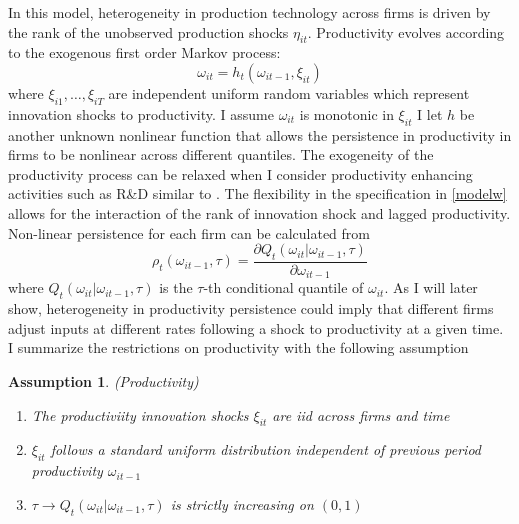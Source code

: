 \documentclass{article}
\newtheorem{assump}{Assumption}[section]
\begin{document}
In this model, heterogeneity in production technology across firms is driven by the rank of the unobserved production shocks $\eta_{it}$. Productivity evolves according to the exogenous first order Markov process:
\begin{equation}\label{modelw}
\omega_{it}=h_{t}(\omega_{it-1}, \xi_{it})
\end{equation}
where $\xi_{i1},\dots, \xi_{iT}$ are independent uniform random variables which represent innovation shocks to productivity. I assume $\omega_{it}$ is monotonic in $\xi_{it}$ I let $h$ be another unknown nonlinear function that allows the persistence in productivity in firms to be nonlinear across different quantiles. The exogeneity of the productivity process can be relaxed when I consider productivity enhancing activities such as R\&D similar to \cite{Doraszelski2013}. The flexibility in the specification in \eqref{modelw} allows for the interaction of the rank of innovation shock and lagged productivity. Non-linear persistence for each firm can be calculated from
\begin{equation}
\rho_{t}(\omega_{it-1}, \tau)=\frac{\partial Q_{t}(\omega_{it}|\omega_{it-1}, \tau)}{\partial \omega_{it-1}}
\end{equation}
where $Q_{t}(\omega_{it}|\omega_{it-1}, \tau)$ is the $\tau$-th conditional quantile of $\omega_{it}$. As I will later show, heterogeneity in productivity persistence could imply that different firms adjust inputs at different rates following a shock to productivity at a given time. I summarize the restrictions on productivity with the following assumption
\begin{assump} (Productivity) \label{productivity1}
~
\begin{enumerate}[label=(\alph*)]
	\item The productiviity innovation shocks $\xi_{it}$ are iid across firms and time
    \item $\xi_{it}$ follows a standard uniform distribution independent of previous period productivity $\omega_{it-1}$
    \item $\tau\rightarrow Q_{t}(\omega_{it}|\omega_{it-1}, \tau)$ is strictly increasing on $(0,1)$
\end{enumerate}
\end{assump}
\end{document}
